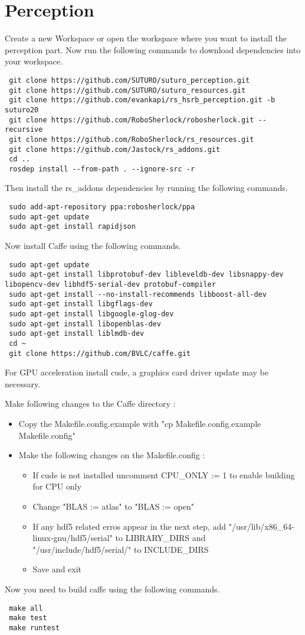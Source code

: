 \documentclass[main.tex]{subfiles}
\begin{document}
 \section{Perception}
 Create a new Workspace or open the workspace where you want to install the perception part. Now run the following commands to download dependencies into your workspace.
 
 \begin{lstlisting}
 git clone https://github.com/SUTURO/suturo_perception.git
 git clone https://github.com/SUTURO/suturo_resources.git 
 git clone https://github.com/evankapi/rs_hsrb_perception.git -b suturo20
 git clone https://github.com/RoboSherlock/robosherlock.git --recursive
 git clone https://github.com/RoboSherlock/rs_resources.git
 git clone https://github.com/Jastock/rs_addons.git
 cd ..
 rosdep install --from-path . --ignore-src -r \end{lstlisting}
 
 Then install the rs\_addons dependencies by running the following commands.
 \begin{lstlisting}
 sudo add-apt-repository ppa:robosherlock/ppa
 sudo apt-get update
 sudo apt-get install rapidjson \end{lstlisting}
 
 Now install Caffe using the following commands.
 \begin{lstlisting}
 sudo apt-get update
 sudo apt-get install libprotobuf-dev libleveldb-dev libsnappy-dev libopencv-dev libhdf5-serial-dev protobuf-compiler
 sudo apt-get install --no-install-recommends libboost-all-dev
 sudo apt-get install libgflags-dev
 sudo apt-get install libgoogle-glog-dev
 sudo apt-get install libopenblas-dev
 sudo apt-get install liblmdb-dev
 cd ~
 git clone https://github.com/BVLC/caffe.git \end{lstlisting}
 
 For GPU acceleration install cude, a graphics card driver update may be necessary.
 
 Make following changes to the Caffe directory : 
 \begin{itemize}
 \item Copy the Makefile.config.example with "cp Makefile.config.example Makefile.config"
 \item Make the following changes on the Makefile.config :
 	\begin{itemize}
 	\item If cude is not installed uncomment CPU\_ONLY := 1 to enable building for CPU only
 	\item Change "BLAS := atlas" to "BLAS := open"
 	\item If any hdf5 related erros appear in the next step, add "/usr/lib/x86\_64-linux-gnu/hdf5/serial" to LIBRARY\_DIRS and "/usr/include/hdf5/serial/" to INCLUDE\_DIRS
 	\item Save and exit
 	\end{itemize}
 	
 \end{itemize}
Now you need to build caffe using the following commands.
\begin{lstlisting}
 make all
 make test
 make runtest  \end{lstlisting}

 
\end{document}
